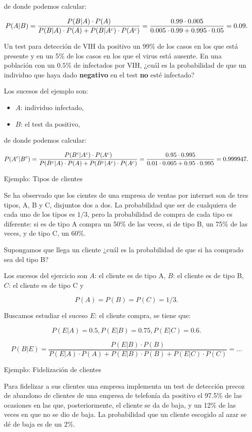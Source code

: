 \documentclass[
  letterpaper,
  DIV=11,
  numbers=noendperiod]{scrreprt}
\providecommand{\tightlist}{%
  \setlength{\itemsep}{0pt}\setlength{\parskip}{0pt}}\usepackage{longtable,booktabs,array}
\begin{document}
de donde podemos calcular:

\[\scriptsize{
P(A|B) =\dfrac{P(B|A)\cdot P(A)}{P(B|A)\cdot P(A)+P(B|A^c)\cdot P(A^c)}=\dfrac{0.99\cdot 0.005}{0.005\cdot 0.99+0.995\cdot 0.05}=0.09.}
\]

Un test para detección de VIH da positivo un 99\% de los casos en los
que está presente y en un 5\% de los casos en los que el virus está
ausente. En una población con un \(0.5\%\) de infectados por VIH, ¿cuál
es la probabilidad de que un individuo que haya dado \textbf{negativo}
en el test \textbf{no} esté infectado?

Los sucesos del ejemplo son:

\begin{itemize}
\tightlist
\item
  \(A\): individuo infectado,
\item
  \(B\): el test da positivo,
\end{itemize}

de donde podemos calcular:

\[
\scriptsize{P(A^c|B^c) =\dfrac{P(B^c|A^c)\cdot P(A^c)}{P(B^c|A)\cdot P(A)+P(B^c|A^c)\cdot P(A^c)}=\dfrac{0.95\cdot 0.995}{0.01\cdot 0.005+0.95\cdot 0.995}=0.999947.}
\]

Ejemplo: Tipos de clientes

Se ha observado que los cientes de una empresa de ventas por internet
son de tres tipos, A, B y C, disjuntos dos a dos. La probabilidad que
ser de cualquiera de cada uno de los tipos es \(1/3\), pero la
probabilidad de compra de cada tipo es diferente: si es de tipo A compra
un 50\% de las veces, si de tipo B, un 75\% de las veces, y de tipo C,
un 60\%.

Supongamos que llega un cliente ¿cuál es la probabilidad de que si ha
comprado sea del tipo B?

Los sucesos del ejercicio son \(A\): el cliente es de tipo A, \(B\): el
cliente es de tipo B, \(C\): el cliente es de tipo C y

\[P(A)=P(B)=P(C)=1/3.\]

Buscamos estudiar el suceso \(E\): el cliente compra, se tiene que:

\[P(E|A)=0.5, P(E|B)=0.75, P(E|C)=0.6.\]

\[P(B|E)\!=\!\dfrac{P(E|B)\cdot P(B)}{P(E|A)\!\cdot\! P(A)\!+\!P(E|B)\!\cdot\! P(B)\!+\!P(E|C)\!\cdot\! P(C)}\!=\!\ldots\]

Ejemplo: Fidelización de clientes

Para fidelizar a sus clientes una empresa implementa un test de
detección precoz de abandono de clientes de una empresa de telefonía da
positivo el 97.5\% de las ocasiones en las que, posteriormente, el
cliente se da de baja, y un 12\% de las veces en que no se dio de baja.
La probabilidad que un cliente escogido al azar se dé de baja es de un
2\%.
\end{document}
